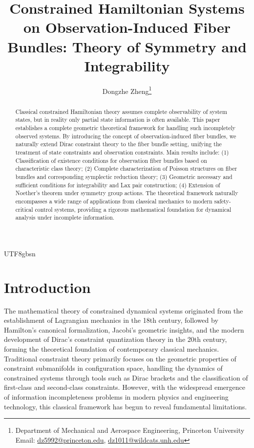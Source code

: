 \documentclass[a4paper,12pt]{extarticle}
\theoremstyle{definition}
\begin{document}
\begin{CJK}{UTF8}{gbsn}

\title{Constrained Hamiltonian Systems on Observation-Induced Fiber Bundles: Theory of Symmetry and Integrability}
\author{Dongzhe Zheng\thanks{Department of Mechanical and Aerospace Engineering, Princeton University\\ Email: \href{mailto:dz5992@princeton.edu}{dz5992@princeton.edu}, \href{mailto:dz1011@wildcats.unh.edu}{dz1011@wildcats.unh.edu}}}
\date{}
\maketitle

\begin{abstract}
Classical constrained Hamiltonian theory assumes complete observability of system states, but in reality only partial state information is often available. This paper establishes a complete geometric theoretical framework for handling such incompletely observed systems. By introducing the concept of observation-induced fiber bundles, we naturally extend Dirac constraint theory to the fiber bundle setting, unifying the treatment of state constraints and observation constraints. Main results include: (1) Classification of existence conditions for observation fiber bundles based on characteristic class theory; (2) Complete characterization of Poisson structures on fiber bundles and corresponding symplectic reduction theory; (3) Geometric necessary and sufficient conditions for integrability and Lax pair construction; (4) Extension of Noether's theorem under symmetry group actions. The theoretical framework naturally encompasses a wide range of applications from classical mechanics to modern safety-critical control systems, providing a rigorous mathematical foundation for dynamical analysis under incomplete information.
\end{abstract}

\section{Introduction}

The mathematical theory of constrained dynamical systems originated from the establishment of Lagrangian mechanics in the 18th century\cite{arnold1989mathematical}, followed by Hamilton's canonical formalization\cite{hamilton1834general}, Jacobi's geometric insights\cite{jacobi1866vorlesungen}, and the modern development of Dirac's constraint quantization theory\cite{dirac1964lectures, dirac1950generalized} in the 20th century, forming the theoretical foundation of contemporary classical mechanics. Traditional constraint theory primarily focuses on the geometric properties of constraint submanifolds in configuration space, handling the dynamics of constrained systems through tools such as Dirac brackets\cite{dirac1950generalized} and the classification of first-class and second-class constraints\cite{henneaux1992quantization}. However, with the widespread emergence of information incompleteness problems in modern physics and engineering technology, this classical framework has begun to reveal fundamental limitations.


\end{CJK}
\end{document}
